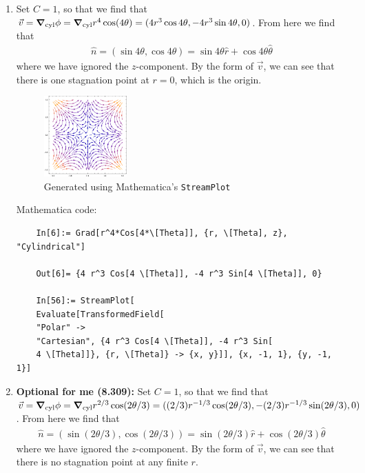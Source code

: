 \documentclass{article}
\theoremstyle{definition}
\begin{document}
\begin{enumerate}[label=(\alph*)]
	
	
	\item Set $C=1$, so that we find that $\vec{v} = \grad_\text{cyl} \phi = \grad_\text{cyl} r^4 \cos(4\theta) = (4r^3\cos 4\theta, -4r^3 \sin4 \theta,0)$. From here we find that 
	\begin{align*}
	\hat{n} = (\sin 4 \theta, \cos 4 \theta) = \sin 4 \theta \hat{r} + \cos 4 \theta \hat{\theta}
	\end{align*}
	where we have ignored the $z$-component. By the form of $\vec{v}$, we can see that there is one stagnation point at $r=0$, which is the origin. \\
	
	\begin{figure}[!htb]
		\centering
		\includegraphics[width=0.3\textwidth]{1b.eps}
		\caption{Generated using Mathematica's \texttt{StreamPlot}}
	\end{figure}
	
	Mathematica code:
	\begin{lstlisting}
	In[6]:= Grad[r^4*Cos[4*\[Theta]], {r, \[Theta], z}, "Cylindrical"]
	
	Out[6]= {4 r^3 Cos[4 \[Theta]], -4 r^3 Sin[4 \[Theta]], 0}
	
	In[56]:= StreamPlot[
	Evaluate[TransformedField[
	"Polar" -> 
	"Cartesian", {4 r^3 Cos[4 \[Theta]], -4 r^3 Sin[
	4 \[Theta]]}, {r, \[Theta]} -> {x, y}]], {x, -1, 1}, {y, -1, 1}]
	\end{lstlisting}
	
	\item \textbf{Optional for me (8.309):} Set $C=1$, so that we find that $\vec{v} = \grad_\text{cyl} \phi = \grad_\text{cyl} r^{2/3} \cos(2\theta/3) = ((2/3)r^{-1/3}\cos (2\theta/3), -(2/3)r^{-1/3} \sin (2 \theta/3),0)$. From here we find that 
	\begin{align*}
	\hat{n} = (\sin (2 \theta/3), \cos (2 \theta/3)) = \sin (2 \theta/3) \hat{r} + \cos (2 \theta/3) \hat{\theta}
	\end{align*}
	where we have ignored the $z$-component. By the form of $\vec{v}$, we can see that there is no stagnation point at any finite $r$. \\
	

\end{enumerate}
\end{document}
